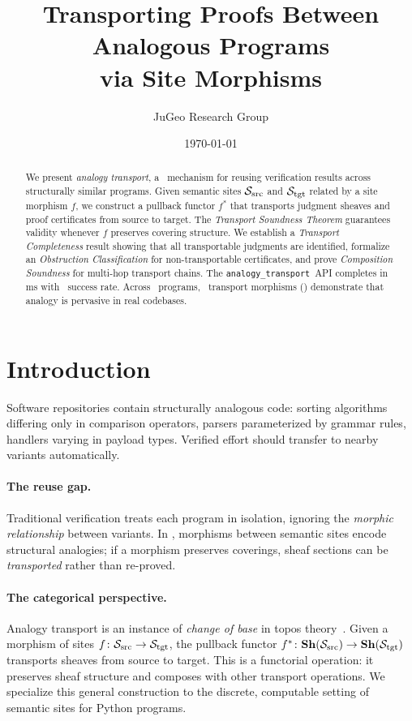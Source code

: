 \documentclass[11pt]{article}
\title{\textbf{Transporting Proofs Between Analogous Programs\\
via Site Morphisms}}
\author{%
  JuGeo Research Group
}
\date{\today}
\newcommand{\AnalogyTransport}{\texttt{analogy\_transport}}
\newcommand{\SourceSite}{\Site_{\mathrm{src}}}
\newcommand{\TargetSite}{\Site_{\mathrm{tgt}}}
\begin{document}
\maketitle

\begin{abstract}
We present \emph{analogy transport}, a \JuGeo\ mechanism for reusing
verification results across structurally similar programs.  Given
semantic sites $\SourceSite$ and $\TargetSite$ related by a site
morphism $f$, we construct a pullback functor $f^{*}$ that transports
judgment sheaves and proof certificates from source to target.  The
\emph{Transport Soundness Theorem} guarantees validity whenever $f$
preserves covering structure.  We establish a \emph{Transport
Completeness} result showing that all transportable judgments are
identified, formalize an \emph{Obstruction Classification} for
non-transportable certificates, and prove \emph{Composition
Soundness} for multi-hop transport chains.  The \AnalogyTransport\ API
completes in \compProfAnalogyTransportMeanMs\,ms with
\compProfAnalogyTransportRate\ success rate.  Across
\compTotalPrograms\ programs, \compMorphTransport\ transport morphisms
(\compMorphTransportPct) demonstrate that analogy is pervasive in real
codebases.
\end{abstract}

\section{Introduction}\label{sec:intro}

Software repositories contain structurally analogous code: sorting
algorithms differing only in comparison operators, parsers parameterized
by grammar rules, handlers varying in payload types.  Verified effort
should transfer to nearby variants automatically.

\paragraph{The reuse gap.}
Traditional verification treats each program in isolation, ignoring
the \emph{morphic relationship} between variants.  In \JuGeo,
morphisms between semantic sites encode structural analogies; if a
morphism preserves coverings, sheaf sections can be \emph{transported}
rather than re-proved.

\paragraph{The categorical perspective.}
Analogy transport is an instance of \emph{change of base} in topos
theory~\cite{MacLane1994}.  Given a morphism of sites
$f \colon \SourceSite \to \TargetSite$, the pullback functor
$f^{*} \colon \mathbf{Sh}(\SourceSite) \to \mathbf{Sh}(\TargetSite)$
transports sheaves from source to target.  This is a functorial
operation: it preserves sheaf structure and composes with other
transport operations.  We specialize this general construction to
the discrete, computable setting of semantic sites for Python programs.
\end{document}
